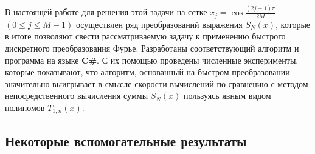 В настоящей работе для решения этой задачи на сетке $x_j=\cos\frac{(2j+1)\pi}{2M}$ $(0\le j\le M-1)$ осуществлен ряд преобразований выражения $S_N(x)$,
которые в итоге позволяют свести рассматриваемую задачу к применению быстрого дискретного преобразования Фурье.
Разработаны соответствующий алгоритм и программа на языке \textbf{C\#}.
С  их помощью проведены численные эксперименты, которые показывают, что алгоритм, основанный на быстром преобразовании
значительно выигрывает в смысле скорости вычислений по сравнению с методом непосредственного вычисления суммы $S_N(x)$ пользуясь явным видом полиномов $T_{1,n}(x)$.

\subsection{Некоторые вспомогательные результаты}

